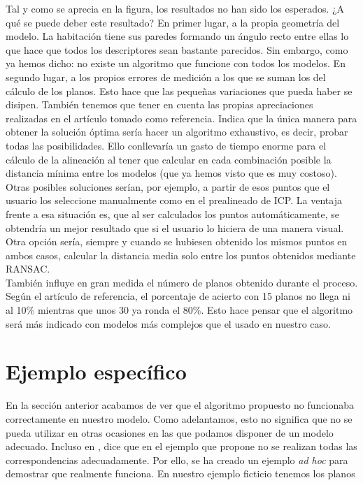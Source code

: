 Tal y como se aprecia en la figura, los resultados no han sido los esperados. ¿A qué se puede deber este resultado? En primer lugar, a la propia geometría del modelo. La habitación tiene sus paredes formando un ángulo recto entre ellas lo que hace que todos los descriptores sean bastante parecidos. Sin embargo, como ya hemos dicho: no existe un algoritmo que funcione con todos los modelos. En segundo lugar, a los propios errores de medición a los que se suman los del cálculo de los planos. Esto hace que las pequeñas variaciones que pueda haber se disipen. También tenemos que tener en cuenta las propias apreciaciones realizadas en el artículo tomado como referencia. Indica que la única manera para obtener la solución óptima sería hacer un algoritmo exhaustivo, es decir, probar todas las posibilidades. Ello conllevaría un gasto de tiempo enorme para el cálculo de la alineación al tener que calcular en cada combinación posible la distancia mínima entre los modelos (que ya hemos visto que es muy costoso). Otras posibles soluciones serían, por ejemplo, a partir de esos puntos que el usuario los seleccione manualmente como en el prealineado de ICP. La ventaja frente a esa situación es, que al ser calculados los puntos automáticamente, se obtendría un mejor resultado que si el usuario lo hiciera de una manera visual. Otra opción sería, siempre y cuando se hubiesen obtenido los mismos puntos en ambos casos, calcular la distancia media solo entre los puntos obtenidos mediante RANSAC. \\

También influye en gran medida el número de planos obtenido durante el proceso. Según el artículo de referencia, el porcentaje de acierto con 15 planos no llega ni al 10\% mientras que unos 30 ya ronda el 80\%. Esto hace pensar que el algoritmo será más indicado con modelos más complejos que el usado en nuestro caso.

\section{Ejemplo específico}
En la sección anterior acabamos de ver que el algoritmo propuesto no funcionaba correctamente en nuestro modelo. Como adelantamos, esto no significa que no se pueda utilizar en otras ocasiones en las que podamos disponer de un modelo adecuado. Incluso en \cite{theiler2012automatic}, dice que en el ejemplo que propone no se realizan todas las correspondencias adecuadamente. Por ello, se ha creado un ejemplo \textit{ad hoc} para demostrar que realmente funciona. En nuestro ejemplo ficticio tenemos los planos


